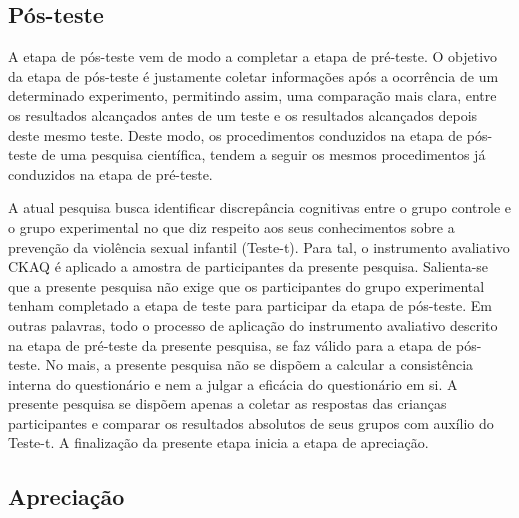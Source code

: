 \subsection{Pós-teste}\label{subsec:posteste}

A etapa de pós-teste vem de modo a completar a etapa de pré-teste. O objetivo da etapa de pós-teste é justamente coletar informações após a ocorrência de um determinado experimento, permitindo assim, uma comparação mais clara, entre os resultados alcançados antes de um teste e os resultados alcançados depois deste mesmo teste. Deste modo, os procedimentos conduzidos na etapa de pós-teste de uma pesquisa científica, tendem a seguir os mesmos procedimentos já conduzidos na etapa de pré-teste. 

A atual pesquisa busca identificar discrepância cognitivas entre o grupo controle e o grupo experimental no que diz respeito aos seus conhecimentos sobre a prevenção da violência sexual infantil (Teste-t). Para tal, o instrumento avaliativo \ac{CKAQ} é aplicado a amostra de participantes da presente pesquisa. Salienta-se que a presente pesquisa não exige que os participantes do grupo experimental tenham completado a etapa de teste para participar da etapa de pós-teste. Em outras palavras, todo o processo de aplicação do instrumento avaliativo descrito na etapa de pré-teste da presente pesquisa, se faz válido para a etapa de pós-teste. No mais, a presente pesquisa não se dispõem a calcular a consistência interna do questionário e nem a julgar a eficácia do questionário em si. A presente pesquisa se dispõem apenas a coletar as respostas das crianças participantes e comparar os resultados absolutos de seus grupos com auxílio do Teste-t. A finalização da presente etapa inicia a etapa de apreciação.



\subsection{Apreciação}\label{subsec:grupo}

